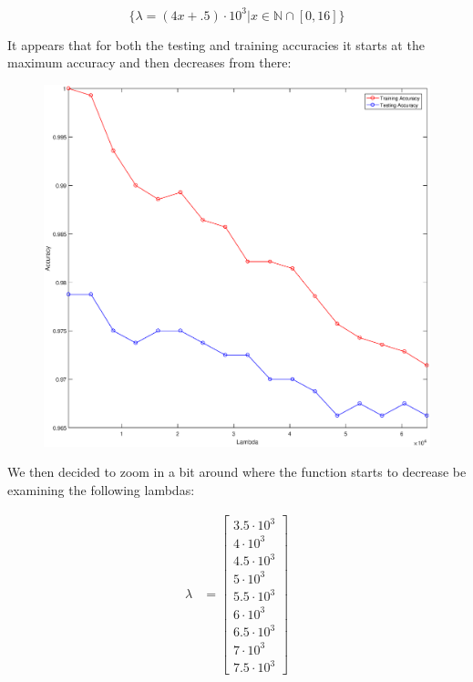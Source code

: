 \documentclass{article}
\begin{document}
$$
\{\lambda = (4x + .5) \cdot 10^{3} |x\in{\mathbb{N} \cap [0,16]} \}
$$


It appears that for both the testing and training accuracies it starts at the maximum accuracy and then decreases from there:
\newpage

	\begin{figure}[h!]
		\begin{center} 
			\includegraphics[scale=0.5]{lambda_accuracy_out.eps} 
		\end{center}  
		\label{fig:M5}
	\end{figure}


We then decided to zoom in a bit around where the function starts to decrease be examining the following lambdas:
	
	\begin{align}
		\lambda &= \begin{bmatrix}
		3.5 \cdot 10^{3} \\
		4 \cdot 10^{3} \\
		4.5 \cdot 10^{3} \\
		5 \cdot 10^{3} \\
		5.5 \cdot 10^{3} \\
		6 \cdot 10^{3} \\
		6.5 \cdot 10^{3} \\
		7 \cdot 10^{3} \\
		7.5 \cdot 10^{3}
		\end{bmatrix} 
	\end{align}
	
\end{document}
